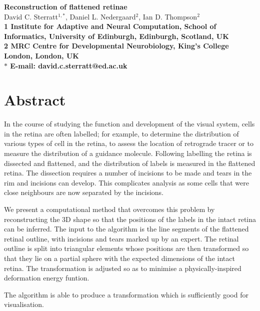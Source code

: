 \documentclass[10pt]{article}
\date{}
\begin{document}
\begin{flushleft}
{\Large
\textbf{Reconstruction of flattened retinae}
}
\\
David C. Sterratt$^{1,\ast}$, Daniel L. Nedergaard$^{2}$, Ian
D. Thompson$^{2}$
\\
\bf{1} Institute for Adaptive and Neural Computation, School of
Informatics, University of Edinburgh, Edinburgh, Scotland, UK
\\
\bf{2} MRC Centre for Developmental Neurobiology, King's College
London, London, UK
\\
$\ast$ E-mail: david.c.sterratt@ed.ac.uk
\end{flushleft}

\section*{Abstract}

In the course of studying the function and development of the visual
system, cells in the retina are often labelled; for example, to
determine the distribution of various types of cell in the retina, to
assess the location of retrograde tracer or to measure the
distribution of a guidance molecule.  Following labelling the retina
is dissected and flattened, and the distribution of labels is measured
in the flattened retina.  The dissection requires a number of
incisions to be made and tears in the rim and incisions can
develop. This complicates analysis as some cells that were close
neighbours are now separated by the incisions.

We present a computational method that overcomes this problem by
reconstructing the 3D shape so that the positions of the labels in the
intact retina can be inferred. The input to the algorithm is the line
segments of the flattened retinal outline, with incisions and tears
marked up by an expert. The retinal outline is split into triangular
elements whose positions are then transformed so that they lie on a
partial sphere with the expected dimensions of the intact retina.  The
transformation is adjusted so as to minimise a physically-inspired
deformation energy funtion.


The algorithm is able to produce a transformation which is
sufficiently good for visualisation.  
\end{document}
